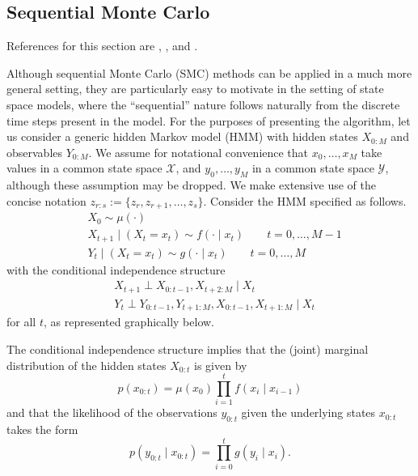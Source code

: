 \documentclass{article}
\begin{document}
\subsection{Sequential Monte Carlo}\label{sec:smc}
References for this section are \citet{doucet2001}, \citet{delmoral2006}, and \citet{doucet2009}.

Although sequential Monte Carlo (SMC) methods can be applied in a much more general setting, they are particularly easy to motivate in the setting of state space models, where the ``sequential'' nature follows naturally from the discrete time steps present in the model. 
For the purposes of presenting the algorithm, let us consider a generic hidden Markov model (HMM) with hidden states $X_{0:M}$ and observables $Y_{0:M}$. We assume for notational convenience that $x_0,\dots,x_M$ take values in a common state space $\mathcal{X}$, and $y_0,\dots,y_M$ in a common state space $\mathcal{Y}$, although these assumption may be dropped. 
We make extensive use of the concise notation $z_{r:s} := \{z_r, z_{r+1}, \dots, z_s\}$.
Consider the HMM specified as follows.
\begin{align*}
& X_0 \sim \mu(\cdot) \\
& X_{t+1} \mid (X_t = x_t) \sim f(\cdot \mid x_t)  \qquad t=0,\dots,M-1 \\
& Y_t \mid (X_t = x_t) \sim g(\cdot \mid x_t) \qquad t=0,\dots,M
\end{align*}
with the conditional independence structure
\begin{align*}
& X_{t+1} \perp X_{0:t-1}, X_{t+2:M} \mid X_t \\
& Y_t \perp Y_{0:t-1}, Y_{t+1:M}, X_{0:t-1}, X_{t+1:M} \mid X_t
\end{align*}
for all $t$, as represented graphically below.

\begin{center}
\end{center}

The conditional independence structure implies that the (joint) marginal distribution of the hidden states $X_{0:t}$ is given by
\begin{equation*} \label{eq:hmm_marginal}
p(x_{0:t}) = \mu(x_0) \prod_{i=1}^t f(x_i \mid x_{i-1})
\end{equation*}
and that the likelihood of the observations $y_{0:t}$ given the underlying states $x_{0:t}$ takes the form
\begin{equation*} \label{eq:hmm_likelihood}
p(y_{0:t} \mid x_{0:t}) = \prod_{i=0}^t g(y_i \mid x_i).
\end{equation*}
\end{document}
